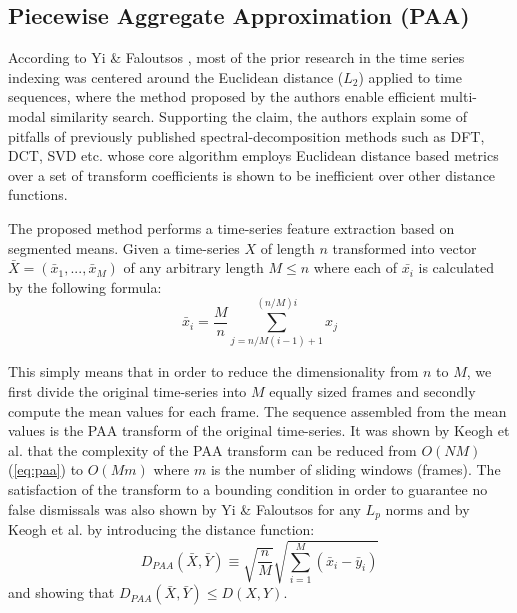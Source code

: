 \subsection{Piecewise Aggregate Approximation (PAA)} \label{paa}
According to Yi \& Faloutsos \cite{citeulike:2946589}, most of the prior research in the time series indexing was centered around the Euclidean distance ($L_{2}$) applied to time sequences, where the method proposed by the authors enable efficient multi-modal similarity search. Supporting the claim, the authors explain some of pitfalls of previously published spectral-decomposition methods such as DFT, DCT, SVD etc. whose core algorithm employs Euclidean distance based metrics over a set of transform coefficients is shown to be inefficient over other distance functions.

The proposed method performs a time-series feature extraction based on segmented means. Given a time-series $X$ of length $n$ transformed into vector $\bar{X} = ( \bar{x}_{1}, ..., \bar{x}_{M} )$ of any arbitrary length $M \leq n$ where each of $\bar{x_{i}}$ is calculated by the following formula:
\begin{equation}
\bar{x}_{i} = \frac{M}{n} \sum_{j=n/M(i-1)+1}^{(n/M)i} x_{j}
\label{eq:paa}
\end{equation}

This simply means that in order to reduce the dimensionality from $n$ to $M$, we first divide the original time-series into $M$ equally sized frames and secondly compute the mean values for each frame. The sequence assembled from the mean values is the PAA transform of the original time-series. It was shown by Keogh et al. that the complexity of the PAA transform can be reduced from $O(NM)$ (\ref{eq:paa}) to $O(Mm)$ where $m$ is the number of sliding windows (frames). The satisfaction of the transform to a bounding condition in order to guarantee no false dismissals was also shown by Yi \& Faloutsos for any $L_{p}$ norms and by Keogh et al. \cite{citeulike:3000416} by introducing the distance function:
\begin{equation}
D_{PAA}(\bar{X}, \bar{Y}) \equiv \sqrt{\frac{n}{M}} \sqrt{ \sum_{i=1}^{M} 
\left(  \bar{x}_{i} - \bar{y}_{i} \right)}
\label{eq:paa_distance}
\end{equation}
and showing that $D_{PAA}(\bar{X}, \bar{Y}) \leq D(X,Y)$.

